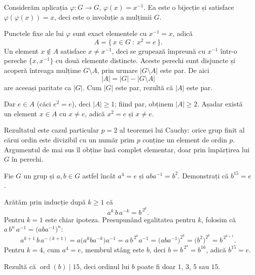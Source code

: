 \begin{solutie}
Considerăm aplicația $\varphi : G \to G$, $\varphi(x)=x^{-1}$.
Ea este o bijecție și satisface $\varphi(\varphi(x))=x$, deci este
o involuție a mulțimii $G$.

Punctele fixe ale lui $\varphi$ sunt exact elementele cu $x^{-1}=x$, adică
\[
  A = \{\, x \in G \ :\ x^{2}=e \,\}.
\]
Un element $x \notin A$ satisface $x \neq x^{-1}$, deci se grupează
împreună cu $x^{-1}$ într-o pereche $\{x, x^{-1}\}$ cu două
elemente distincte. Aceste perechi sunt disjuncte și acoperă
întreaga mulțime $G \setminus A$, prin urmare $|G \setminus A|$
este par. De aici
\[
  |A| = |G| - |G \setminus A|
\]
are aceeași paritate ca $|G|$. Cum $|G|$ este par, rezultă că
$|A|$ este par.

Dar $e \in A$ (căci $e^{2}=e$), deci $|A| \geq 1$; fiind par,
obținem $|A| \geq 2$. Așadar există un element $x \in A$ cu
$x \neq e$, adică $x^{2}=e$ și $x \neq e$.
\end{solutie}

\begin{obs}
Rezultatul este cazul particular $p=2$ al teoremei lui Cauchy: orice grup
finit al cărui ordin este divizibil cu un număr prim $p$ conține
un element de ordin $p$. Argumentul de mai sus îl obține însă
complet elementar, doar prin împărțirea lui $G$ în perechi.
\end{obs}

\begin{problema}[Clasică]
Fie $G$ un grup și $a,b \in G$ astfel încât $a^{4}=e$ și
$aba^{-1}=b^{2}$. Demonstrați că $b^{15}=e$.
\end{problema}

\begin{solutie}
Arătăm prin inducție după $k \geq 1$ că
\[
  a^{k}\,b\,a^{-k} = b^{\,2^{k}} .
\]
Pentru $k=1$ este chiar ipoteza. Presupunând egalitatea pentru $k$,
folosim că $a\,b^{n}\,a^{-1}=\bigl(aba^{-1}\bigr)^{n}$:
\[
  a^{k+1}\,b\,a^{-(k+1)}
  = a\bigl(a^{k}ba^{-k}\bigr)a^{-1}
  = a\,b^{\,2^{k}}a^{-1}
  = \bigl(aba^{-1}\bigr)^{2^{k}}
  = \bigl(b^{2}\bigr)^{2^{k}}
  = b^{\,2^{k+1}} .
\]
Pentru $k=4$, cum $a^{4}=e$, membrul stâng este $b$, deci
$b = b^{\,2^{4}} = b^{16}$, adică $b^{15}=e$.
\end{solutie}

\begin{obs}
Rezultă că $\operatorname{ord}(b) \mid 15$, deci ordinul lui $b$
poate fi doar $1$, $3$, $5$ sau $15$.
\end{obs}

